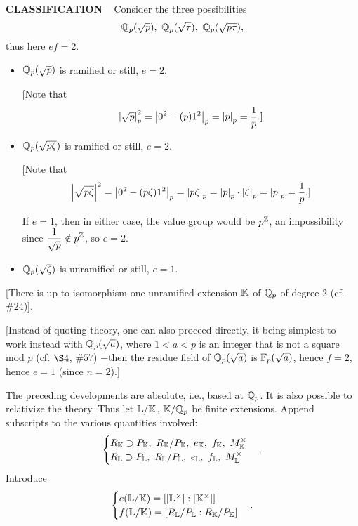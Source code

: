 \begin{x}{\small\bf CLASSIFICATION} \ %
Consider the three possibilities
\[
\Q_p(\sqrt{p}), \ \Q_p(\sqrt{\tau}), \ \Q_p(\sqrt{p \tau}),
\]
thus here $ef = 2$.
\begin{itemize}
\item $\mathbb{Q}_p(\sqrt{p})$ is ramified or still, $e = 2$.

\vspace{0.1cm}

[Note that
\[
\left\vert\sqrt{p}\right\vert_p^2 = \left\vert0^2 - (p)1^2\right\vert_p = \left\vert p\right\vert_p = \frac{1}{p}.]
\]
\item $\mathbb{Q}_p(\sqrt{p \zeta})$ is ramified or still, $e = 2$.\\

\vspace{0.1cm}

[Note that
\[
\left\vert\sqrt{p \zeta}\right\vert^2 
= \left\vert0^2 - (p \zeta)1^2\right\vert_p 
= \left\vert p \zeta\right\vert_p 
= \left\vert p\right\vert_p \cdot \left\vert\zeta\right\vert_p 
= \left\vert p\right\vert_p = \frac{1}{p}.]
\]

If $e = 1$, then in either case, the value group would be $p^{\mathbb{Z}}$, an impossibility since 
$\displaystyle\frac{1}{\sqrt{p}} \notin p^{\mathbb{Z}}$, so $e = 2$.
\item $\mathbb{Q}_p(\sqrt{\zeta})$ is unramified or still, $e = 1$.
\end{itemize}

\vspace{0.1cm}

[There is up to isomorphism one unramified extension $\mathbb{K}$ of $\mathbb{Q}_p$ of degree 2 (cf. $\# 24$)].

\vspace{0.1cm}

[Instead of quoting theory, one can also proceed directly, it being simplest to work instead with $\mathbb{Q}_p(\sqrt{a})$, 
where $1 < a < p$ is an integer that is not a square mod $p$ (cf. $\S 4$, $\#57$) 
$-$then the residue field of $\mathbb{Q}_p(\sqrt{a})$ is $\mathbb{F}_p(\sqrt{a})$, hence $f = 2$, hence $e = 1$ (since $n = 2$).]
\end{x}

\vspace{0.1cm}

The preceding developments are absolute, i.e., based at $\mathbb{Q}_p$.  
It is also possible to relativize the theory.  
Thus let $\mathbb{L}/\mathbb{K}$, $\mathbb{K}/\mathbb{Q}_p$ be finite extensions.  
Append subscripts to the various quantities involved:
\[
\begin{cases}
R_\K \supset P_{\K}, \ R_\K/P_{\K}, \ e_{\K}, \ f_{\K}, \ M_\K^\times \\
R_\LL \supset P_{\LL}, \ R_\LL/P_{\LL}, \ e_{\LL}, \ f_{\LL}, \ M_\LL^\times
\end{cases}
.
\]
Introduce
\[
\begin{cases}
e(\mathbb{L}/\mathbb{K}) = [\left\vert\mathbb{L}^\times\right\vert:\left\vert\mathbb{K}^\times\right\vert] \\
f(\mathbb{L}/\mathbb{K}) = [R_{\mathbb{L}}/P_{\mathbb{L}}:R_{\mathbb{K}}/P_{\mathbb{K}}]
\end{cases}
.
\]
\vspace{0.2cm}

